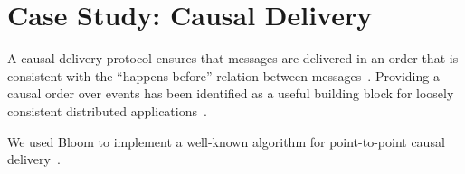 \section{Case Study: Causal Delivery}
\label{sec:causal}
A causal delivery protocol ensures that messages are delivered in an order that
is consistent with the ``happens before'' relation between
messages~\cite{Lamport1978}. Providing a causal order over events has been
identified as a useful building block for loosely consistent distributed
applications~\cite{Lloyd2011}.

We used Bloom to implement a well-known algorithm for point-to-point causal
delivery~\cite{Schiper1989}.
